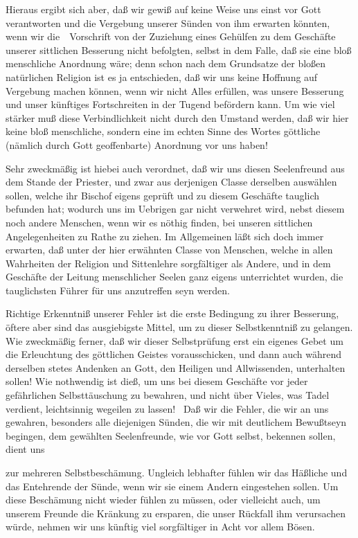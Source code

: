 \begin{aufza}
\begin{aufzb}
\end{aufzb}
Hieraus ergibt sich aber, daß wir gewiß auf keine Weise uns einst vor Gott verantworten und die Vergebung unserer Sünden von ihm erwarten könnten, wenn wir die~\ Vorschrift von der Zuziehung eines Gehülfen zu dem Geschäfte unserer sittlichen Besserung nicht befolgten, selbst in dem Falle, daß sie eine bloß menschliche Anordnung wäre; denn schon nach dem Grundsatze der bloßen natürlichen Religion ist es ja entschieden, daß wir uns keine Hoffnung auf Vergebung machen können, wenn wir nicht Alles erfüllen, was unsere Besserung und unser künftiges Fortschreiten in der Tugend befördern kann. Um wie viel stärker muß diese Verbindlichkeit nicht durch den Umstand werden, daß wir hier keine bloß menschliche, sondern eine im echten Sinne des Wortes göttliche (nämlich durch Gott geoffenbarte) Anordnung vor uns haben!\par
Sehr zweckmäßig ist hiebei auch verordnet, daß wir uns diesen Seelenfreund aus dem Stande der Priester, und zwar aus derjenigen Classe derselben auswählen sollen, welche ihr Bischof eigens geprüft und zu diesem Geschäfte tauglich befunden hat; wodurch uns im Uebrigen gar nicht verwehret wird, nebst diesem noch andere Menschen, wenn wir es nöthig finden, bei unseren sittlichen Angelegenheiten zu Rathe zu ziehen. Im Allgemeinen läßt sich doch immer erwarten, daß unter der hier erwähnten Classe von Menschen, welche in allen Wahrheiten der Religion und Sittenlehre sorgfältiger als Andere, und in dem Geschäfte der Leitung menschlicher Seelen ganz eigens unterrichtet wurden, die tauglichsten Führer für uns anzutreffen seyn werden.
\item Richtige Erkenntniß unserer Fehler ist die erste Bedingung zu ihrer Besserung, öftere  aber sind das ausgiebigste Mittel, um zu dieser Selbstkenntniß zu gelangen. Wie zweckmäßig ferner, daß wir dieser Selbstprüfung erst ein eigenes Gebet um die Erleuchtung des göttlichen Geistes vorausschicken, und dann auch während derselben stetes Andenken an Gott, den Heiligen und Allwissenden, unterhalten sollen! Wie nothwendig ist dieß, um uns bei diesem Geschäfte vor jeder gefährlichen Selbsttäuschung zu bewahren, und nicht über Vieles, was Tadel verdient, leichtsinnig wegeilen zu lassen! \usw\ Daß wir die Fehler, die wir an uns gewahren, besonders alle diejenigen Sünden, die wir mit deutlichem Bewußtseyn begingen, dem gewählten Seelenfreunde, wie vor Gott selbst, bekennen sollen, dient uns~
\begin{aufzb}
\item zur mehreren Selbstbeschämung. Ungleich lebhafter fühlen wir das Häßliche und das Entehrende der Sünde, wenn wir sie einem Andern eingestehen sollen. Um diese Beschämung nicht wieder fühlen zu müssen, oder vielleicht auch, um unserem Freunde die Kränkung zu ersparen, die unser Rückfall ihm verursachen würde, nehmen wir uns künftig viel sorgfältiger in Acht vor allem Bösen.

\end{aufzb}
\end{aufza}
